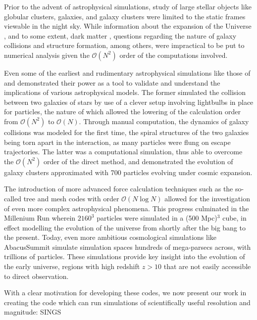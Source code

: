 \documentclass[12pt, twoside, letterpaper]{article}
\begin{document}
Prior to the advent of astrophysical simulations, study of large stellar objects like globular clusters, galaxies, and galaxy clusters were limited to the static frames viewable in the night sky. While information about the expansion of the Universe \citep{hubble1929relation}, and to some extent, dark matter \citep{zwicky1933rotverschiebung}, questions regarding the nature of galaxy collisions and structure formation, among others, were impractical to be put to numerical analysis given the $\mathcal{O}(N^2)$ order of the computations involved.

Even some of the earliest and rudimentary astrophysical simulations like those of \citet{holmberg1941clustering} and \citet{white1976dynamics} demonstrated their power as a tool to validate and understand the implications of various astrophysical models. The former simulated the collision between two galaxies of stars by use of a clever setup involving lightbulbs in place for particles, the nature of which allowed the lowering of the calculation order from $\mathcal{O}(N^2)$ to $\mathcal{O}(N)$. Through manual computation, the dynamics of galaxy collisions was modeled for the first time, the spiral structures of the two galaxies being torn apart in the interaction, as many particles were flung on escape trajectories. The latter was a computational simulation, thus able to overcome the $\mathcal{O}(N^2)$ order of the direct method, and demonstrated the evolution of galaxy clusters approximated with 700 particles evolving under cosmic expansion. 

The introduction of more advanced force calculation techniques such as the so-called tree \citep{appel1981investigation} and mesh codes \citep{eastwood1974shaping} with order $\mathcal{O}(N \log N)$ allowed for the investigation of even more complex astrophysical phenomena. This progress culminated in the Millenium Run \citep{springel2005simulating} wherein $2160^3$ particles were simulated in a (500 Mpc)$^3$ cube, in effect modelling the evolution of the universe from shortly after the big bang to the present. Today, even more ambitious cosmological simulations like AbacusSummit \citep{maksimova2021abacussummit} simulate simulation spaces hundreds of mega-parsecs across, with trillions of particles. These simulations provide key insight into the evolution of the early universe, regions with high redshift $z > 10$ that are not easily accessible to direct observation. 

With a clear motivation for developing these codes, we now present our work in creating the code which can run simulations of scientifically useful resolution and magnitude: SINGS
\end{document}
